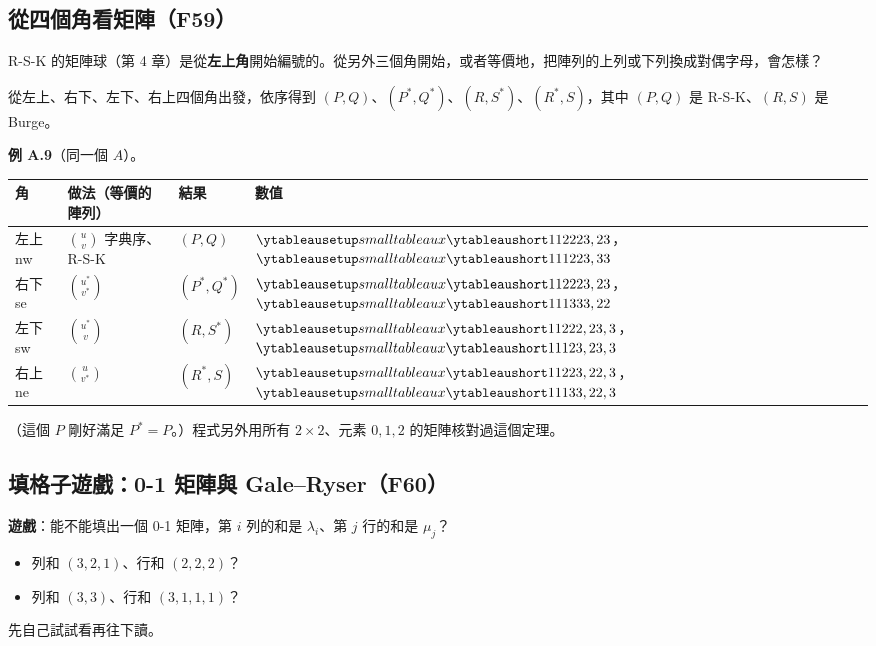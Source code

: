 \subsection{從四個角看矩陣（F59）}\label{sec:f-corners}

R-S-K 的矩陣球（第 4 章）是從\textbf{左上角}開始編號的。從另外三個角開始，或者等價地，把陣列的上列或下列換成對偶字母，會怎樣？

\begin{thmbox}
從左上、右下、左下、右上四個角出發，依序得到 $(P,Q)$、$(P^*,Q^*)$、$(R,S^*)$、$(R^*,S)$，其中 $(P,Q)$ 是 R-S-K、$(R,S)$ 是 Burge。
\end{thmbox}

\textbf{例 A.9}（同一個 $A$）。
\begin{center}
\renewcommand{\arraystretch}{2.6}
\begin{tabular}{@{}llll@{}}
\toprule
角 & 做法（等價的陣列） & 結果 & 數值\\
\midrule
左上 nw & $\binom{u}{v}$ 字典序、R-S-K & $(P,Q)$ & $\yts{112223,23}$，$\yts{111223,33}$\\
右下 se & $\binom{u^*}{v^*}$ & $(P^*,Q^*)$ & $\yts{112223,23}$，$\yts{111333,22}$\\
左下 sw & $\binom{u^*}{v}$ & $(R,S^*)$ & $\yts{11222,23,3}$，$\yts{11123,23,3}$\\
右上 ne & $\binom{u}{v^*}$ & $(R^*,S)$ & $\yts{11223,22,3}$，$\yts{11133,22,3}$\\
\bottomrule
\end{tabular}
\end{center}
（這個 $P$ 剛好滿足 $P^*=P$。）程式另外用所有 $2\times2$、元素 $0,1,2$ 的矩陣核對過這個定理。

\subsection{填格子遊戲：0-1 矩陣與 Gale--Ryser（F60）}\label{sec:f-zeroone}

\textbf{遊戲}：能不能填出一個 0-1 矩陣，第 $i$ 列的和是 $\lambda_i$、第 $j$ 行的和是 $\mu_j$？
\begin{itemize}[nosep]
\item 列和 $(3,2,1)$、行和 $(2,2,2)$？
\item 列和 $(3,3)$、行和 $(3,1,1,1)$？
\end{itemize}
先自己試試看再往下讀。

